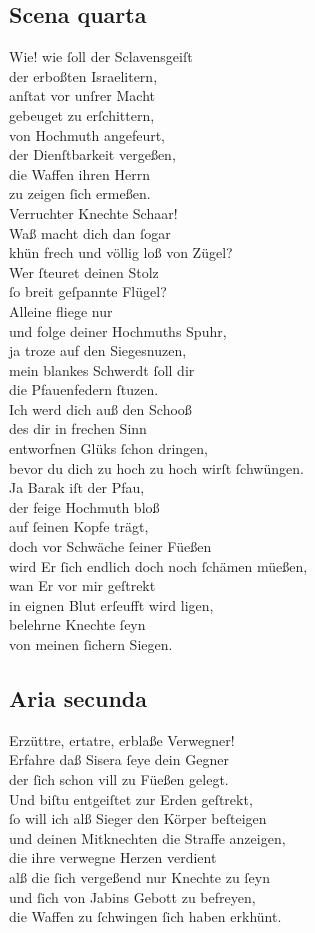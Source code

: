 \documentclass{ees}
\newenvironment{lyrics}[1]{%
  \subsection{#1}\nopagebreak%
  \begin{lyricslist}%
  \let\voice\item%
}{%
  \end{lyricslist}%
}
\begin{document}
\begin{lyrics}{Scena quarta}
  \voice[Sisera]
  Wie! wie ſoll der Sclavensgeiſt\\
  der erboßten Israelitern,\\
  anſtat vor unſrer Macht\\
  gebeuget zu erſchittern,\\
  von Hochmuth angefeurt,\\
  der Dienſtbarkeit vergeßen,\\
  die Waffen ihren Herrn\\
  zu zeigen ſich ermeßen.\\
  Verruchter Knechte Schaar!\\
  Waß macht dich dan ſogar\\
  khün frech und völlig loß von Zügel?\\
  Wer ſteuret deinen Stolz\\
  ſo breit geſpannte Flügel?\\
  Alleine fliege nur\\
  und folge deiner Hochmuths Spuhr,\\
  ja troze auf den Siegesnuzen,\\
  mein blankes Schwerdt ſoll dir\\
  die Pfauenfedern ſtuzen.\\
  Ich werd dich auß den Schooß\\
  des dir in frechen Sinn\\
  entworfnen Glüks ſchon dringen,\\
  bevor du dich zu hoch zu hoch wirſt ſchwüngen.\\
  Ja Barak iſt der Pfau,\\
  der feige Hochmuth bloß\\
  auf ſeinen Kopfe trägt,\\
  doch vor Schwäche ſeiner Füeßen\\
  wird Er ſich endlich doch noch ſchämen müeßen,\\
  wan Er vor mir geſtrekt\\
  in eignen Blut erſeufft wird ligen,\\
  belehrne Knechte ſeyn\\
  von meinen ſichern Siegen.
\end{lyrics}

\begin{lyrics}{Aria secunda}
  \voice[Sisera]
  Erzüttre, ertatre, erblaße Verwegner!\\
  Erfahre daß Sisera ſeye dein Gegner\\
  der ſich schon vill zu Füeßen gelegt.\\
  Und biſtu entgeiſtet zur Erden geſtrekt,\\
  ſo will ich alß Sieger den Körper beſteigen\\
  und deinen Mitknechten die Straffe anzeigen,\\[1ex]
  die ihre verwegne Herzen verdient\\
  alß die ſich vergeßend nur Knechte zu ſeyn\\
  und ſich von Jabins Gebott zu befreyen,\\
  die Waffen zu ſchwingen ſich haben erkhünt.
\end{lyrics}
\end{document}
